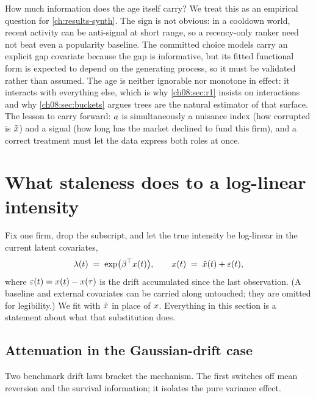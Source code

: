 How much information does the age itself carry? We treat this as an
empirical question for \cref{ch:results-synth}. The sign is not obvious:
in a cooldown world, recent activity can be anti-signal at short range,
so a recency-only ranker need not beat even a popularity baseline. The
committed choice models carry an explicit gap covariate because the gap
is informative, but its fitted functional form is expected to depend on
the generating process, so it must be validated rather than assumed. The
age is neither ignorable nor
monotone in effect: it interacts with everything else, which is why
\cref{ch08:sec:r1} insists on interactions and why
\cref{ch08:sec:buckets} argues trees are the natural estimator of that
surface. The lesson to carry forward: $a$ is simultaneously a
nuisance index (how corrupted is $\tilde{x}$) and a signal (how
long has the market declined to fund this firm), and a correct treatment
must let the data express both roles at once.

\section{What staleness does to a log-linear intensity}
\label{ch08:sec:consequences}

Fix one firm, drop the subscript, and let the true intensity be
log-linear in the current latent covariates,
\begin{equation}\label{eq:ch08:truelam}
\lambda(t) \;=\; \exp\!\big(\beta^{\top} x(t)\big),
\qquad
x(t) \;=\; \tilde{x}(t) + \varepsilon(t),
\end{equation}
where $\varepsilon(t) = x(t) - x(\tau)$ is the drift accumulated since
the last observation. (A baseline and external covariates can be carried
along untouched; they are omitted for legibility.) We fit with
$\tilde{x}$ in place of $x$. Everything in this section is a
statement about what that substitution does.

\subsection{Attenuation in the Gaussian-drift case}
\label{ch08:sec:attenuation}

Two benchmark drift laws bracket the mechanism. The first switches off
mean reversion and the survival information; it isolates the pure
variance effect.


